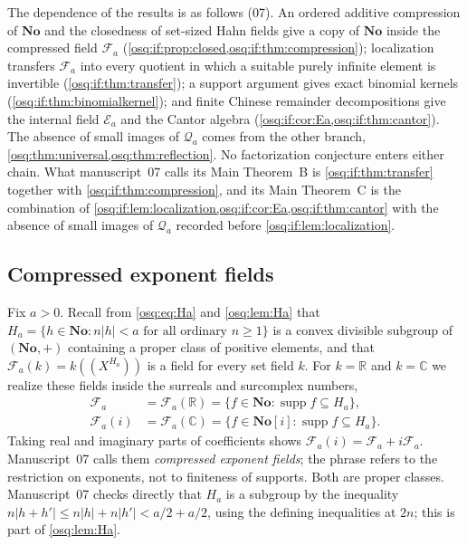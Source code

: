 \documentclass[11pt,letterpaper]{article}
\numberwithin{equation}{section}
\theoremstyle{definition}
\theoremstyle{remark}
\theoremstyle{plain}
\newcommand{\No}{\mathbf{No}}
\newcommand{\SC}{\No[i]}
\newcommand{\R}{\mathbb R}
\newcommand{\C}{\mathbb C}
\newcommand{\FF}{\mathscr F}         %
\newcommand{\EE}{\mathscr E}         %
\newcommand{\Qa}{\mathcal Q}         %
\newcommand{\hahn}[2]{#1(\!(X^{#2})\!)}
\newcommand{\supp}{\operatorname{supp}}
\begin{document}
The dependence of the results is as follows (07). An ordered additive compression of
$\No$ and the closedness of set-sized Hahn fields give a copy of $\No$ inside the
compressed field $\FF_a$ (\cref{osq:if:prop:closed,osq:if:thm:compression});
localization transfers $\FF_a$ into every quotient in which a suitable purely infinite
element is invertible (\cref{osq:if:thm:transfer}); a support argument gives exact
binomial kernels (\cref{osq:if:thm:binomialkernel}); and finite Chinese remainder
decompositions give the internal field $\EE_a$ and the Cantor algebra
(\cref{osq:if:cor:Ea,osq:if:thm:cantor}). The absence of small images of $\Qa_a$
comes from the other branch, \cref{osq:thm:universal,osq:thm:reflection}. No
factorization conjecture enters either chain. What manuscript~07 calls its Main
Theorem~B is \cref{osq:if:thm:transfer} together with \cref{osq:if:thm:compression},
and its Main Theorem~C is the combination of
\cref{osq:if:lem:localization,osq:if:cor:Ea,osq:if:thm:cantor} with the absence of
small images of $\Qa_a$ recorded before \cref{osq:if:lem:localization}.

\subsection{Compressed exponent fields}\label{osq:if:sub:compressed}

Fix $a>0$. Recall from \eqref{osq:eq:Ha} and \cref{osq:lem:Ha} that
$H_a=\{h\in\No:n|h|<a\text{ for all ordinary }n\ge1\}$ is a convex divisible
subgroup of $(\No,+)$ containing a proper class of positive elements, and that
$\FF_a(k)=\hahn{k}{H_a}$ is a field for every set field $k$. For $k=\R$ and $k=\C$ we
realize these fields inside the surreals and surcomplex numbers,
\begin{equation}\label{osq:if:eq:Fa}
\begin{aligned}
 \FF_a&=\FF_a(\R)=\{f\in\No:\supp f\subseteq H_a\},\\
 \FF_a(i)&=\FF_a(\C)=\{f\in\SC:\supp f\subseteq H_a\}.
\end{aligned}
\end{equation}
Taking real and imaginary parts of coefficients shows $\FF_a(i)=\FF_a+i\FF_a$.
Manuscript~07 calls them \emph{compressed exponent fields}; the phrase refers to the
restriction on exponents, not to finiteness of supports. Both are proper classes.
Manuscript~07 checks directly that $H_a$ is a subgroup by the inequality
$n|h+h'|\le n|h|+n|h'|<a/2+a/2$, using the defining inequalities at $2n$; this is
part of \cref{osq:lem:Ha}.
\end{document}
